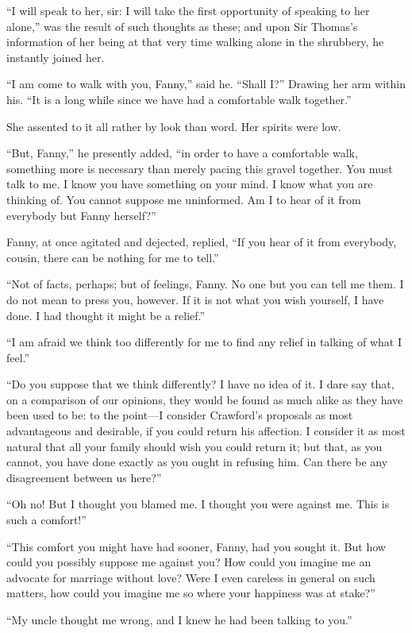 \documentclass{article}
\begin{document}
``I will speak to her, sir:  I will take the first opportunity
of speaking to her alone,'' was the result of such thoughts
as these; and upon Sir Thomas's information of her
being at that very time walking alone in the shrubbery,
he instantly joined her.

``I am come to walk with you, Fanny,'' said he.  ``Shall I?''
Drawing her arm within his.  ``It is a long while since we
have had a comfortable walk together.''

She assented to it all rather by look than word.
Her spirits were low.

``But, Fanny,'' he presently added, ``in order to have a
comfortable walk, something more is necessary than merely
pacing this gravel together.  You must talk to me.
I know you have something on your mind.  I know what you
are thinking of.  You cannot suppose me uninformed.
Am I to hear of it from everybody but Fanny herself?''

Fanny, at once agitated and dejected, replied, ``If you
hear of it from everybody, cousin, there can be nothing
for me to tell.''

``Not of facts, perhaps; but of feelings, Fanny.
No one but you can tell me them.  I do not mean to
press you, however.  If it is not what you wish yourself,
I have done.  I had thought it might be a relief.''

``I am afraid we think too differently for me to find
any relief in talking of what I feel.''

``Do you suppose that we think differently?  I have no idea
of it.  I dare say that, on a comparison of our opinions,
they would be found as much alike as they have been used to be:
to the point---I consider Crawford's proposals as most
advantageous and desirable, if you could return his affection.
I consider it as most natural that all your family
should wish you could return it; but that, as you cannot,
you have done exactly as you ought in refusing him.
Can there be any disagreement between us here?''

``Oh no!  But I thought you blamed me.  I thought you
were against me.  This is such a comfort!''

``This comfort you might have had sooner, Fanny, had you
sought it.  But how could you possibly suppose me against you?
How could you imagine me an advocate for marriage without love?
Were I even careless in general on such matters, how could
you imagine me so where your happiness was at stake?''

``My uncle thought me wrong, and I knew he had been talking
to you.''
\end{document}
